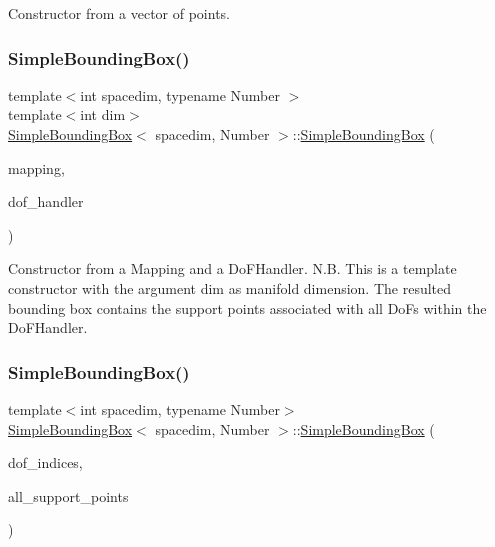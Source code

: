 Constructor from a vector of points. \mbox{\label{classSimpleBoundingBox_a41f4805f49de9e15c82063927dd7ef10}} 
\subsubsection{\texorpdfstring{Simple\+Bounding\+Box()}{SimpleBoundingBox()}\hspace{0.1cm}{\footnotesize\ttfamily [5/7]}}
{\footnotesize\ttfamily template$<$int spacedim, typename Number $>$ \\
template$<$int dim$>$ \\
\hyperlink{classSimpleBoundingBox}{Simple\+Bounding\+Box}$<$ spacedim, Number $>$\+::\hyperlink{classSimpleBoundingBox}{Simple\+Bounding\+Box} (\begin{DoxyParamCaption}\item[{const Mapping$<$ dim, spacedim $>$ \&}]{mapping,  }\item[{const Do\+F\+Handler$<$ dim, spacedim $>$ \&}]{dof\+\_\+handler }\end{DoxyParamCaption})}

Constructor from a {\ttfamily Mapping} and a {\ttfamily Do\+F\+Handler}. N.\+B. This is a template constructor with the argument dim as manifold dimension. The resulted bounding box contains the support points associated with all Do\+Fs within the Do\+F\+Handler. \mbox{\label{classSimpleBoundingBox_ab2568fcda9400b730d326574fa6ef58c}} 
\subsubsection{\texorpdfstring{Simple\+Bounding\+Box()}{SimpleBoundingBox()}\hspace{0.1cm}{\footnotesize\ttfamily [6/7]}}
{\footnotesize\ttfamily template$<$int spacedim, typename Number$>$ \\
\hyperlink{classSimpleBoundingBox}{Simple\+Bounding\+Box}$<$ spacedim, Number $>$\+::\hyperlink{classSimpleBoundingBox}{Simple\+Bounding\+Box} (\begin{DoxyParamCaption}\item[{const std\+::vector$<$ types\+::global\+\_\+dof\+\_\+index $>$ \&}]{dof\+\_\+indices,  }\item[{const std\+::vector$<$ Point$<$ spacedim, Number $>$$>$ \&}]{all\+\_\+support\+\_\+points }\end{DoxyParamCaption})}

